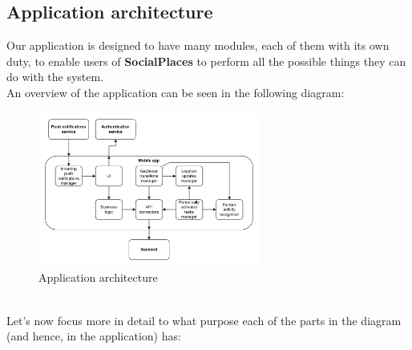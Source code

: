 \documentclass[../../main]{subfiles}
\begin{document}
\subsection{Application architecture}
\label{ss:application-architecture}

Our application is designed to have many modules, each of them with its own duty, to enable users of \textbf{SocialPlaces} to perform all the possible things they can do with the system.\\
An overview of the application can be seen in the following diagram:
\begin{figure}[h]
    \centering
    \includegraphics[width=0.65\textwidth]{images/application_architecture}
    \caption{Application architecture}\label{img:application_architecture}
\end{figure}\\
\noindent
Let's now focus more in detail to what purpose each of the parts in the diagram (and hence, in the application) has:
\end{document}

